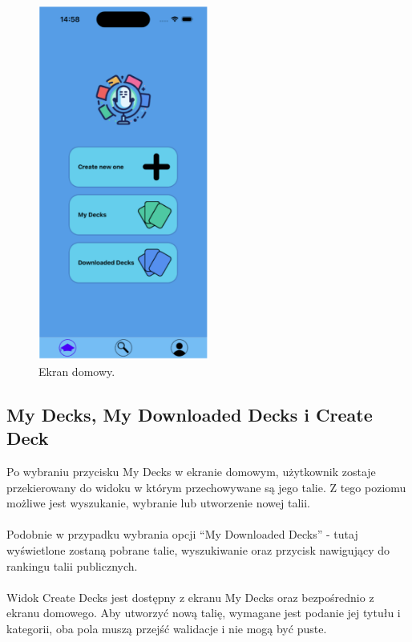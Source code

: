 \begin{figure}[H]
    \centering
    \includegraphics[width=0.5\textwidth]{chapters/chapter_10/images_mobile/mobile_home}
    \caption{Ekran domowy.}
    \label{img:mobile_home}
\end{figure}


\subsection{My Decks, My Downloaded Decks i Create Deck}
Po wybraniu przycisku My Decks w ekranie domowym, użytkownik zostaje przekierowany do widoku w którym przechowywane są jego talie. Z tego poziomu możliwe jest wyszukanie, wybranie lub utworzenie nowej talii. \\\\
Podobnie w przypadku wybrania opcji “My Downloaded Decks” - tutaj wyświetlone zostaną pobrane talie, wyszukiwanie oraz przycisk nawigujący do rankingu talii publicznych. \\\\
Widok Create Decks jest dostępny z ekranu My Decks oraz bezpośrednio z ekranu domowego. Aby utworzyć nową talię, wymagane jest podanie jej tytułu i kategorii, oba pola muszą przejść walidacje i nie mogą być puste.


